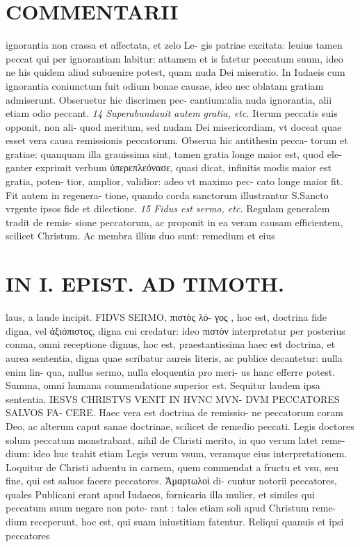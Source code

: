 \documentclass{article}
\begin{document}
\begin{pages}
\section*{COMMENTARII }
\marginpar{[ p.32 ]}\pstart ignorantia non crassa et affectata, et zelo Le- gis patriae excitata: leuius tamen peccat qui per ignorantiam labitur: attamem et is fatetur peccatum suum, ideo ne his quidem aliud subuenire potest, quam nuda Dei miseratio. In Iudaeis cum ignorantia coniunctum fuit odium bonae causae, ideo nec oblatam gratiam admiserunt. Obseruetur hic discrimen pec- cantium:alia nuda ignorantia, alii etiam odio peccant.  \pend
\textit{14 Superabundauit autem gratia, etc. }\pstart Iterum peccatis suis opponit, non ali- quod meritum, sed nudam Dei misericordiam, vt doceat quae esset vera causa remissionis peccatorum. Obserua hic antithesin pecca- torum et gratiae: quanquam illa grauissima sint, tamen gratia longe maior est, quod ele- ganter exprimit verbum ὐπερεπλεόνασε, quasi dicat, infinitis modis maior est gratia, poten- tior, amplior, validior: adeo vt maximo pec- cato longe maior fit. Fit autem in regenera- tione, quando corda sanctorum illustrantur S.Sancto vrgente ipsos fide et dilectione.  \pend
\textit{15 Fidus est sermo, etc. }\pstart Regulam generalem tradit de remis- sione peccatorum, ac proponit in ea veram causam efficientem, scilicet Christum. Ac membra illius duo sunt: remedium et eius  \pend
\section*{IN I. EPIST. AD TIMOTH. }
\marginpar{[ p.33 ]}\pstart laus, a laude incipit. FIDVS SERMO, πιστὸς λό- γος , hoc est, doctrina fide digna, vel ἀξιόπιστος, digna cui credatur: ideo πιστὸν interpretatur per posterius conma, omni receptione dignus, hoc est, praestantissima haec est doctrina, et aurea sententia, digna quae scribatur aureis literis, ac publice decantetur: nulla enim lin- qua, nullus sermo, nulla eloquentia pro meri- us hanc efferre potest. Summa, omni humana commendatione superior est.  \pend\pstart Sequitur laudem ipsa sententia. IESVS CHRISTVS VENIT IN HVNC MVN- DVM PECCATORES SALVOS FA- CERE. Haec vera est doctrina de remissio- ne peccatorum coram Deo, ac alterum caput sanae doctrinae, scilicet de remedio peccati. Legis doctores solum peccatum monstrabant, nihil de Christi merito, in quo verum latet reme- dium: ideo huc trahit etiam Legis verum vsum, veramque eius interpretationem.  \pend\pstart Loquitur de Christi aduentu in carnem, quem commendat a fructu et vsu, seu fine, qui est saluos facere peccatores. Ἁμαρτωλοὶ di- cuntur notorii peccatores, quales Publicani erant apud Iudaeos, fornicaria illa mulier, et similes qui peccatum suum negare non pote- rant : tales etiam soli apud Christum reme- dium receperunt, hoc est, qui suam iniustitiam fatentur. Reliqui quanuis et ipsi peccatores  \pend

\end{pages}
\end{document}
